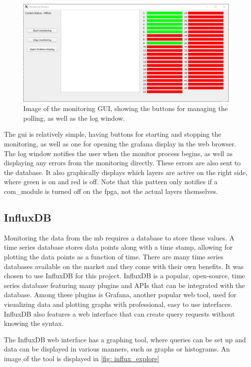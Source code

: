 \documentclass[main.tex]{subfiles}
\begin{document}
\begin{figure}[!ht]
    \centering
    \includegraphics[scale=0.6]{images/monitoring_gui.png}
    \caption{Image of the monitoring GUI, showing the buttons for managing the polling, as well as the log window.}
    \label{fig: monitor_gui}
\end{figure}
\FloatBarrier

The \gls{gui} is relatively simple, having buttons for starting and stopping the monitoring, as well as one for opening the grafana display in the web browser. The log window notifies the user when the monitor process begins, as well as displaying any errors from the monitoring directly. These errors are also sent to the database. It also graphically displays which layers are active on the right side, where green is on and red is off. Note that this pattern only notifies if a com\_module is turned off on the \gls{fpga}, not the actual layers themselves.

\subsection{InfluxDB}
\label{ssec: influxdb}
Monitoring the data from the \gls{mb} requires a database to store these values. A time series database stores data points along with a time stamp, allowing for plotting the data points as a function of time. There are many time series databases available on the market and they come with their own benefits. It was chosen to use InfluxDB for this project. InfluxDB is a popular, open-source, time series database featuring many plugins and APIs that can be integrated with the database. Among these plugins is Grafana, another popular web tool, used for visualizing data and plotting graphs with professional, easy to use interfaces. InfluxDB also features a web interface that can create query requests without knowing the syntax.

The InfluxDB web interface has a graphing tool, where queries can be set up and data can be displayed in various manners, such as graphs or histograms. An image of the tool is displayed in \autoref{fig: influx_explore}
\end{document}
